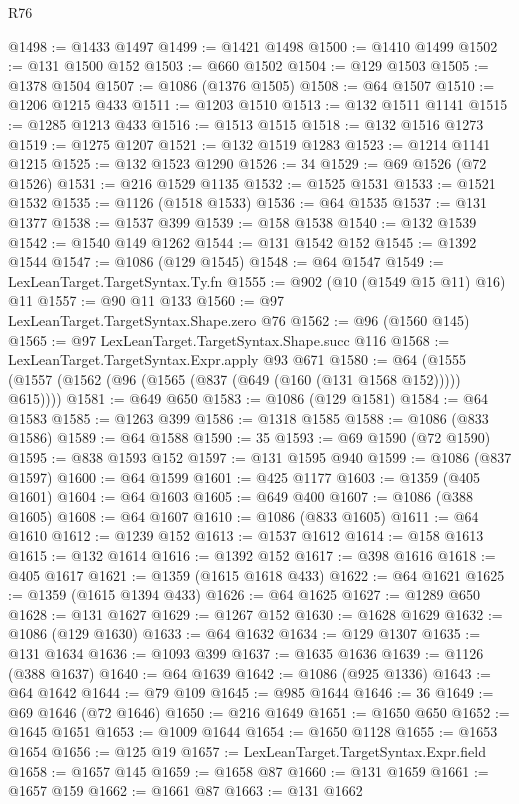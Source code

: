 \begin{lexlean}{R76}
\begin{coremodule}
@1498 := @1433 @1497
@1499 := @1421 @1498
@1500 := @1410 @1499
@1502 := @131 @1500 @152
@1503 := @660 @1502
@1504 := @129 @1503
@1505 := @1378 @1504
@1507 := @1086 (@1376 @1505)
@1508 := @64 @1507
@1510 := @1206 @1215 @433
@1511 := @1203 @1510
@1513 := @132 @1511 @1141
@1515 := @1285 @1213 @433
@1516 := @1513 @1515
@1518 := @132 @1516 @1273
@1519 := @1275 @1207
@1521 := @132 @1519 @1283
@1523 := @1214 @1141 @1215
@1525 := @132 @1523 @1290
@1526 := 34
@1529 := @69 @1526 (@72 @1526)
@1531 := @216 @1529 @1135
@1532 := @1525 @1531
@1533 := @1521 @1532
@1535 := @1126 (@1518 @1533)
@1536 := @64 @1535
@1537 := @131 @1377
@1538 := @1537 @399
@1539 := @158 @1538
@1540 := @132 @1539
@1542 := @1540 @149 @1262
@1544 := @131 @1542 @152
@1545 := @1392 @1544
@1547 := @1086 (@129 @1545)
@1548 := @64 @1547
@1549 := LexLeanTarget.TargetSyntax.Ty.fn
@1555 := @902 (@10 (@1549 @15 @11) @16) @11
@1557 := @90 @11 @133
@1560 := @97 LexLeanTarget.TargetSyntax.Shape.zero @76
@1562 := @96 (@1560 @145)
@1565 := @97 LexLeanTarget.TargetSyntax.Shape.succ @116
@1568 := LexLeanTarget.TargetSyntax.Expr.apply @93 @671
@1580 := @64 (@1555 (@1557 (@1562 (@96 (@1565 (@837 (@649 (@160 (@131 @1568 @152))))) @615))))
@1581 := @649 @650
@1583 := @1086 (@129 @1581)
@1584 := @64 @1583
@1585 := @1263 @399
@1586 := @1318 @1585
@1588 := @1086 (@833 @1586)
@1589 := @64 @1588
@1590 := 35
@1593 := @69 @1590 (@72 @1590)
@1595 := @838 @1593 @152
@1597 := @131 @1595 @940
@1599 := @1086 (@837 @1597)
@1600 := @64 @1599
@1601 := @425 @1177
@1603 := @1359 (@405 @1601)
@1604 := @64 @1603
@1605 := @649 @400
@1607 := @1086 (@388 @1605)
@1608 := @64 @1607
@1610 := @1086 (@833 @1605)
@1611 := @64 @1610
@1612 := @1239 @152
@1613 := @1537 @1612
@1614 := @158 @1613
@1615 := @132 @1614
@1616 := @1392 @152
@1617 := @398 @1616
@1618 := @405 @1617
@1621 := @1359 (@1615 @1618 @433)
@1622 := @64 @1621
@1625 := @1359 (@1615 @1394 @433)
@1626 := @64 @1625
@1627 := @1289 @650
@1628 := @131 @1627
@1629 := @1267 @152
@1630 := @1628 @1629
@1632 := @1086 (@129 @1630)
@1633 := @64 @1632
@1634 := @129 @1307
@1635 := @131 @1634
@1636 := @1093 @399
@1637 := @1635 @1636
@1639 := @1126 (@388 @1637)
@1640 := @64 @1639
@1642 := @1086 (@925 @1336)
@1643 := @64 @1642
@1644 := @79 @109
@1645 := @985 @1644
@1646 := 36
@1649 := @69 @1646 (@72 @1646)
@1650 := @216 @1649
@1651 := @1650 @650
@1652 := @1645 @1651
@1653 := @1009 @1644
@1654 := @1650 @1128
@1655 := @1653 @1654
@1656 := @125 @19
@1657 := LexLeanTarget.TargetSyntax.Expr.field
@1658 := @1657 @145
@1659 := @1658 @87
@1660 := @131 @1659
@1661 := @1657 @159
@1662 := @1661 @87
@1663 := @131 @1662

\end{coremodule}
\end{lexlean}
